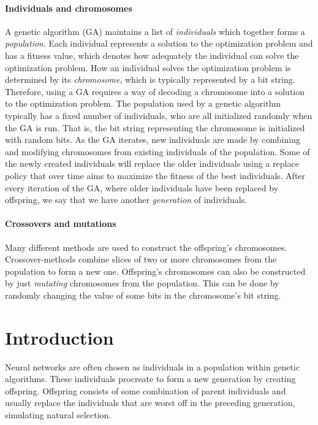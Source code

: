 \paragraph{Individuals and chromosomes}
A genetic algorithm (GA) maintains a list of \emph{individuals} which together forms a \emph{population}. 
Each individual represents a solution to the optimization problem and has a fitness value, which
denotes how adequately the individual can solve the optimization problem.
How an individual solves the optimization problem is determined by its \emph{chromosome}, which
is typically represented by a bit string. Therefore, using a GA requires a way of decoding
a chromosome into a solution to the optimization problem.
The population used by a genetic algorithm typically has a fixed number of individuals, who are
all initialized randomly when the GA is run. That is, the bit string representing the chromosome is
initialized with random bits.
As the GA iterates, new individuals are made by combining and modifying chromosomes from existing
individuals of the population.
Some of the newly created individuals will replace the older individuals using a replace policy
that over time aims to maximize the fitness of the best individuals.
After every iteration of the GA, where older individuals have been replaced by offspring, we
say that we have another \emph{generation} of individuals.

\paragraph{Crossovers and mutations}
Many different methods are used to construct the offspring's chromosomes.
Crossover-methods combine slices of two or more chromosomes from the population to form a new one.
Offspring's chromosomes can also be constructed by just \emph{mutating} chromosomes from the population.
This can be done by randomly changing the value of some bits in the chromosome's bit string.




\section{Introduction}
Neural networks are often chosen as individuals in a population within genetic algorithms. These individuals procreate to form a new generation by creating offspring. Offspring consists of some combination of parent individuals and usually replace the individuals that are worst off in the preceding generation, simulating natural selection.

